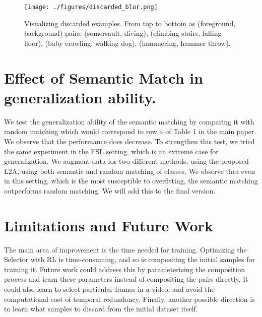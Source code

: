 \documentclass[runningheads]{llncs}
\begin{document}
\begin{figure*}[]
    \centering
    \texttt{[image: ./figures/discarded\_blur.png]}
\caption{Visualizing discarded examples. From top to bottom as (foreground, background) pairs: (somersault, diving), (climbing stairs, falling floor), (baby crawling, walking dog), (hammering, hammer throw). 
    }
    \label{fig:discarded}
\end{figure*}


\section{Effect of Semantic Match in generalization ability.}
\label{gen_ability}
 We test the generalization ability of the semantic matching by comparing it with random matching which would correspond to row 4 of Table 1 in the main paper. We observe that the performance does decrease. To strengthen this test, we tried the same experiment in the FSL setting, which is an extreme case for generalization. We augment data for two different methods, using the proposed L2A, using both semantic and random matching of classes. We observe that even in this setting, which is the most susceptible to overfitting, the semantic matching outperforms random matching. We will add this to the final version. 

\begin{table}[htb]
\centering
{}
\caption{Results on FSL using the proposed Semantic Matching vs random matching using the TruZe \cite{truze} split.}
\end{table}

\section{Limitations and Future Work}

The main area of improvement is the time needed for training. Optimizing the Selector with RL is time-consuming, and so is compositing the initial samples for training it. Future work could address this by parameterizing the composition process and learn these parameters instead of compositing the pairs directly. It could also learn to select particular frames in a video, and avoid the computational cost of temporal redundancy. Finally, another possible direction is to learn what samples to discard from the initial dataset itself.
\end{document}
